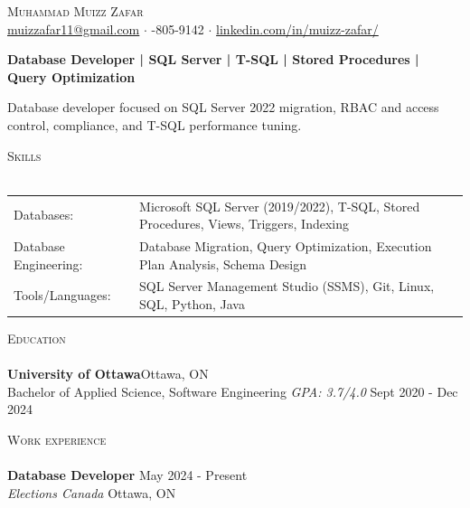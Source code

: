 \documentclass[a4paper]{article}
\newcommand{\lineunder} {
    \vspace*{-8pt} \\
    \hspace*{-18pt} \hrulefill \\
}
\newcommand{\header} [1] {
    {\hspace*{-18pt}\vspace*{6pt} \textsc{#1}}
    \vspace*{-6pt} \lineunder
}
\begin{document}
\vspace*{-40pt}
\vspace*{-10pt}
\begin{center}
	{\Huge \scshape {Muhammad Muizz Zafar}}\\
	\faSend \space \href{mailto:muizzafar11@gmail.com}{muizzafar11@gmail.com} $\cdot$ \faPhoneSquare {}-805-9142 $\cdot$ \faLinkedinSquare \space \href{https://www.linkedin.com/in/muizz-zafar/}{linkedin.com/in/muizz-zafar/}
	\\
\end{center}
\vspace{-5pt}
\begin{center}
\textbf{Database Developer | SQL Server | T-SQL | Stored Procedures | Query Optimization}
\end{center}
\begin{center}
Database developer focused on SQL Server 2022 migration, RBAC and access control, compliance, and T-SQL performance tuning.
\end{center}
\header{Skills}
\begin{tabular}{ l l }
Databases: & Microsoft SQL Server (2019/2022), T-SQL, Stored Procedures, Views, Triggers, Indexing \\
Database Engineering: & Database Migration, Query Optimization, Execution Plan Analysis, Schema Design \\
Tools/Languages: & SQL Server Management Studio (SSMS), Git, Linux, SQL, Python, Java \\
\end{tabular}
\vspace{2mm}
\header{Education}
\textbf{University of Ottawa}\hfill Ottawa, ON\\
Bachelor of Applied Science, Software Engineering \textit{GPA: 3.7/4.0} \hfill Sept 2020 - Dec 2024\\
\vspace{2mm}
\header{Work experience}
\vspace{1.5mm}
\textbf{Database Developer} \hfill May 2024 - Present\\
\textit{Elections Canada} \hfill Ottawa, ON\\
\vspace{-2mm}
\end{document}
